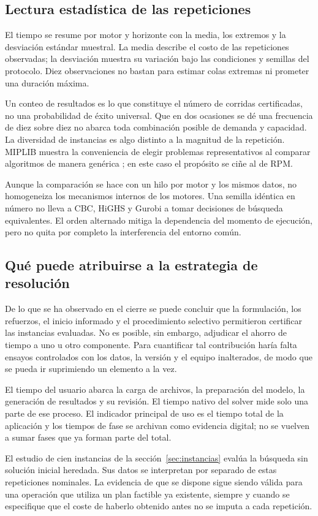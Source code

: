 \subsection{Lectura estadística de las repeticiones}
El tiempo se resume por motor y horizonte con la media, los extremos y la desviación estándar muestral. La media describe el costo de las repeticiones observadas; la desviación muestra su variación bajo las condiciones y semillas del protocolo. Diez observaciones no bastan para estimar colas extremas ni prometer una duración máxima.

Un conteo de resultados es lo que constituye el número de corridas certificadas, no una probabilidad de éxito universal. Que en dos ocasiones se dé una frecuencia de diez sobre diez no abarca toda combinación posible de demanda y capacidad. La diversidad de instancias es algo distinto a la magnitud de la repetición. MIPLIB muestra la conveniencia de elegir problemas representativos al comparar algoritmos de manera genérica \cite{miplib}; en este caso el propósito se ciñe al de RPM.

Aunque la comparación se hace con un hilo por motor y los mismos datos, no homogeneiza los mecanismos internos de los motores. Una semilla idéntica en número no lleva a CBC, HiGHS y Gurobi a tomar decisiones de búsqueda equivalentes. El orden alternado mitiga la dependencia del momento de ejecución, pero no quita por completo la interferencia del entorno común.

\subsection{Qué puede atribuirse a la estrategia de resolución}
De lo que se ha observado en el cierre se puede concluir que la formulación, los refuerzos, el inicio informado y el procedimiento selectivo permitieron certificar las instancias evaluadas. No es posible, sin embargo, adjudicar el ahorro de tiempo a uno u otro componente. Para cuantificar tal contribución haría falta ensayos controlados con los datos, la versión y el equipo inalterados, de modo que se pueda ir suprimiendo un elemento a la vez.

El tiempo del usuario abarca la carga de archivos, la preparación del modelo, la generación de resultados y su revisión. El tiempo nativo del solver mide solo una parte de ese proceso. El indicador principal de uso es el tiempo total de la aplicación y los tiempos de fase se archivan como evidencia digital; no se vuelven a sumar fases que ya forman parte del total.

El estudio de cien instancias de la sección~\ref{sec:instancias} evalúa la búsqueda sin solución inicial heredada. Sus datos se interpretan por separado de estas repeticiones nominales. La evidencia de que se dispone sigue siendo válida para una operación que utiliza un plan factible ya existente, siempre y cuando se especifique que el coste de haberlo obtenido antes no se imputa a cada repetición.
